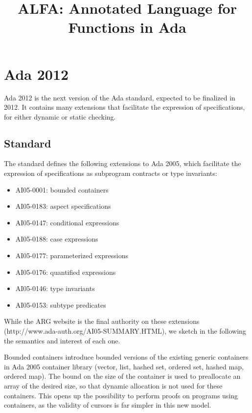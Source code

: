 \documentclass{article}
\title{ALFA: Annotated Language for Functions in Ada}
\begin{document}
\maketitle

\section{Ada 2012}

Ada 2012 is the next version of the Ada standard, expected to be finalized in
2012. It contains many extensions that facilitate the expression of
specifications, for either dynamic or static checking.

\subsection{Standard}

The standard defines the following extensions to Ada 2005, which facilitate the
expression of specifications as subprogram contracts or type invariants:

\begin{itemize}
\item AI05-0001: bounded containers
\item AI05-0183: aspect specifications
\item AI05-0147: conditional expressions
\item AI05-0188: case expressions
\item AI05-0177: parameterized expressions
\item AI05-0176: quantified expressions
\item AI05-0146: type invariants
\item AI05-0153: subtype predicates
\end{itemize}

While the ARG website is the final authority on these extensions
(http://www.ada-auth.org/AI05-SUMMARY.HTML), we sketch in the following the
semantics and interest of each one.

Bounded containers introduce bounded versions of the existing generic
containers in Ada 2005 container library (vector, list, hashed set, ordered
set, hashed map, ordered map). The bound on the size of the container is used
to preallocate an array of the desired size, so that dynamic allocation is not
used for these containers. This opens up the possibility to perform proofs on
programs using containers, as the validity of cursors is far simpler in this
new model.
\end{document}
